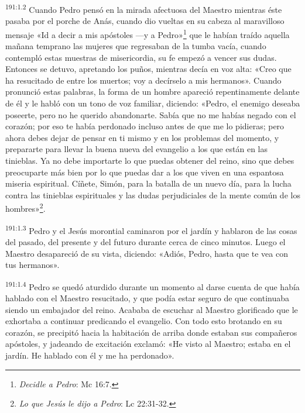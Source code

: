 \par
\textsuperscript{191:1.2} Cuando Pedro pensó en la mirada afectuosa del Maestro mientras éste pasaba por el porche de Anás, cuando dio vueltas en su cabeza al maravilloso mensaje «Id a decir a mis apóstoles ---y a Pedro»\footnote{\textit{Decidle a Pedro}: Mc 16:7.} que le habían traído aquella mañana temprano las mujeres que regresaban de la tumba vacía, cuando contempló estas muestras de misericordia, su fe empezó a vencer sus dudas. Entonces se detuvo, apretando los puños, mientras decía en voz alta: «Creo que ha resucitado de entre los muertos; voy a decírselo a mis hermanos». Cuando pronunció estas palabras, la forma de un hombre apareció repentinamente delante de él y le habló con un tono de voz familiar, diciendo: «Pedro, el enemigo deseaba poseerte, pero no he querido abandonarte. Sabía que no me habías negado con el corazón; por eso te había perdonado incluso antes de que me lo pidieras; pero ahora debes dejar de pensar en ti mismo y en los problemas del momento, y prepararte para llevar la buena nueva del evangelio a los que están en las tinieblas. Ya no debe importarte lo que puedas obtener del reino, sino que debes preocuparte más bien por lo que puedas dar a los que viven en una espantosa miseria espiritual. Cíñete, Simón, para la batalla de un nuevo día, para la lucha contra las tinieblas espirituales y las dudas perjudiciales de la mente común de los hombres»\footnote{\textit{Lo que Jesús le dijo a Pedro}: Lc 22:31-32.}.

\par
\textsuperscript{191:1.3} Pedro y el Jesús morontial caminaron por el jardín y hablaron de las cosas del pasado, del presente y del futuro durante cerca de cinco minutos. Luego el Maestro desapareció de su vista, diciendo: «Adiós, Pedro, hasta que te vea con tus hermanos».

\par
\textsuperscript{191:1.4} Pedro se quedó aturdido durante un momento al darse cuenta de que había hablado con el Maestro resucitado, y que podía estar seguro de que continuaba siendo un embajador del reino. Acababa de escuchar al Maestro glorificado que le exhortaba a continuar predicando el evangelio. Con todo esto brotando en su corazón, se precipitó hacia la habitación de arriba donde estaban sus compañeros apóstoles, y jadeando de excitación exclamó: «He visto al Maestro; estaba en el jardín. He hablado con él y me ha perdonado».

